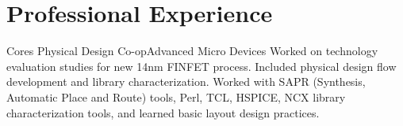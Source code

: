 \section{Professional Experience}

{ Cores Physical Design Co-op}{Advanced Micro Devices}{}{
  Worked on technology evaluation studies for new 14nm FINFET process. Included physical design flow development and library characterization. Worked with SAPR (Synthesis, Automatic Place and Route) tools, Perl, TCL, HSPICE, NCX library characterization tools, and learned basic layout design practices. \\
}
